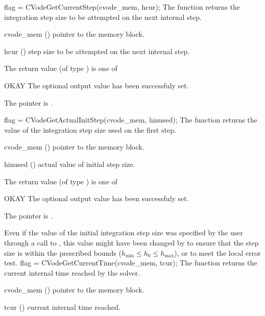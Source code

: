 {}
{
  flag = CVodeGetCurrentStep(cvode\_mem, hcur);
}
{
  The function  returns the
  integration step size to be attempted on the next internal step.
}
{
  \begin{args}
  \item[cvode\_mem] ()
    pointer to the {\cvode} memory block.
  \item[hcur] ()
    step size to be attempted on the next internal step.
  \end{args}
}
{
  The return value  (of type ) is one of
  \begin{args}
  \item[OKAY] 
    The optional output value has been successfuly set.
  \item[\Id{CVG\_NO\_MEM}]
    The  pointer is .
  \end{args}
}
{}
{
  flag = CVodeGetActualInitStep(cvode\_mem, hinused);
}
{
  The function  returns the
  value of the integration step size used on the first step.
}
{
  \begin{args}
  \item[cvode\_mem] ()
    pointer to the {\cvode} memory block.
  \item[hinused] ()
    actual value of initial step size.
  \end{args}
}
{
  The return value  (of type ) is one of
  \begin{args}
  \item[OKAY] 
    The optional output value has been successfuly set.
  \item[\Id{CVG\_NO\_MEM}]
    The  pointer is .
  \end{args}
}
{
  Even if the value of the initial integration step size was specified
  by the user through a call to , this value might have 
  been changed by {\cvode} to ensure that the step size is within the 
  prescribed bounds ($h_{\min} \le h_0 \le h_{\max}$), or to meet the
  local error test.
}
{
  flag = CVodeGetCurrentTime(cvode\_mem, tcur);
}
{
  The function  returns the
  current internal time reached by the solver.
}
{
  \begin{args}
  \item[cvode\_mem] ()
    pointer to the {\cvode} memory block.
  \item[tcur] ()
    current internal time reached.
  \end{args}
}
